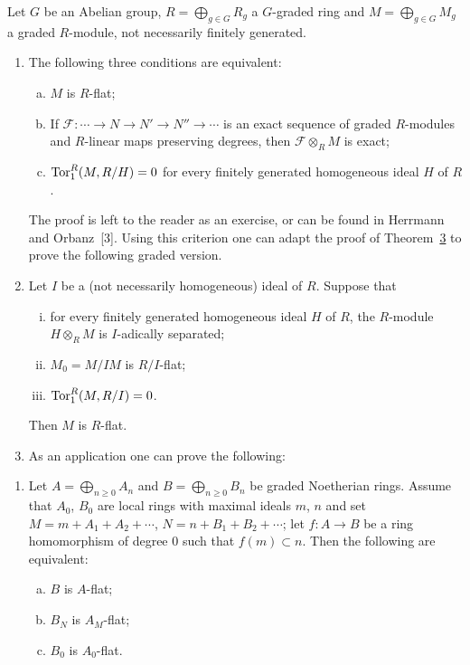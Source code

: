 \begin{remark}
Let $G$ be an Abelian group, $R = \bigoplus_{g \in G} R_g$ a $G$-graded ring and
$M = \bigoplus_{g \in G} M_g$ a graded $R$-module, not necessarily finitely
generated.
\begin{enumerate}[(1)]
  \item The following three conditions are equivalent:
        \begin{enumerate}[(a)]
          \item $M$ is $R$-flat;
          \item If $\mathcal{F}\colon \cdots \to N \to N' \to N'' \to \cdots$ is an exact
                sequence of graded $R$-modules and $R$-linear maps preserving
                degrees, then $\mathcal{F} \otimes_R M$ is exact;
          \item $\operatorname{Tor}^R_1(M, R/H) = 0$ for every finitely generated homogeneous
                ideal $H$ of $R$.
        \end{enumerate}
        The proof is left to the reader as an exercise, or can be found in
        Herrmann and Orbanz~[3]. Using this criterion one can adapt the proof of
        Theorem~\hyperref[thm:22.3]{3} to prove the following graded version.
  \item Let $I$ be a (not necessarily homogeneous) ideal of $R$. Suppose that
        \begin{enumerate}[(i)]
          \item for every finitely generated homogeneous ideal $H$ of $R$, the
                $R$-module $H \otimes_R M$ is $I$-adically separated;
          \item $M_0 = M/IM$ is $R/I$-flat;
          \item $\operatorname{Tor}^R_1(M, R/I) = 0$.
        \end{enumerate}
        Then $M$ is $R$-flat.
  \item As an application one can prove the following:
\end{enumerate}
\begin{enumerate}[(3)]
  \item Let $A = \bigoplus_{n \ge 0} A_n$ and $B = \bigoplus_{n \ge 0} B_n$ be graded Noetherian
        rings. Assume that $A_0$, $B_0$ are local rings with maximal ideals $m$, $n$ and
        set $M = m + A_1 + A_2 + \cdots$, $N = n + B_1 + B_2 + \cdots$; let
        $f\colon A \to B$ be a ring homomorphism of degree $0$ such that $f(m) \subset n$.
        Then the following are equivalent:
        \begin{enumerate}[(a)]
          \item $B$ is $A$-flat;
          \item $B_N$ is $A_M$-flat;
          \item $B_0$ is $A_0$-flat.
        \end{enumerate}
\end{enumerate}
\end{remark}

